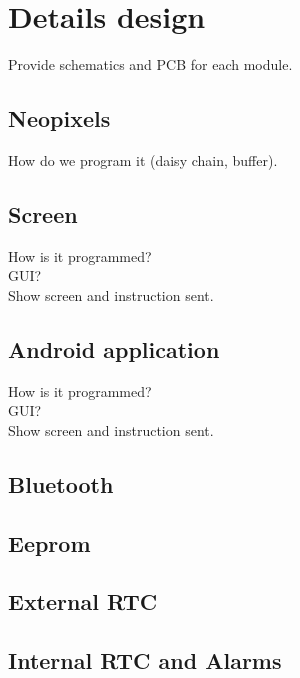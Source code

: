 \section{Details design}
Provide schematics and PCB for each module.
\subsection{Neopixels}
How do we program it (daisy chain, buffer).\\
\subsection{Screen}
How is it programmed?\\
GUI?\\
Show screen and instruction sent.
\subsection{Android application}
How is it programmed?\\
GUI?\\
Show screen and instruction sent.
\subsection{Bluetooth}
\subsection{Eeprom}
\subsection{External RTC}
\subsection{Internal RTC and Alarms}
